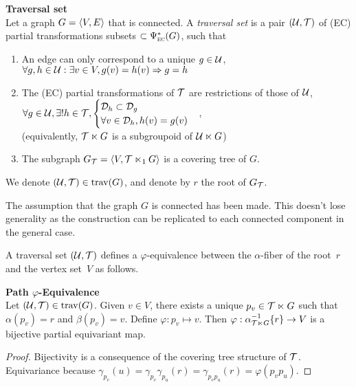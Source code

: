 \begin{definition}\textbf{Traversal set}\\
Let a graph $G = \langle V, E \rangle$ that is connected. A \emph{traversal set} is a pair $(\mathcal{U}, \mathcal{T})$ of (EC) partial transformations subsets $\subset \Psi_{\operatorname{\textsc{ec}}}^*(G)$, such that
\begin{enumerate}
  \item An edge can only correspond to a unique $g\in \mathcal{U}$,\\
    \ie $\forall g,h \in \mathcal{U} : \exists v \in V, g(v) = h(v) \Rightarrow g=h$
  \item The (EC) partial transformations of $\mathcal{T}$ are restrictions of those of $\mathcal{U}$,\\
    \ie $\forall g \in \mathcal{U}, \exists! h \in \mathcal{T}, \begin{cases}\mathcal{D}_h \subset \mathcal{D}_g\\ \forall v \in \mathcal{D}_h, h(v) = g(v)\end{cases}$, \\
    (equivalently, $\mathcal{T} \ltimes G$ is a subgroupoid of $\mathcal{U} \ltimes G$)
  \item The subgraph $G_{\mathcal{T}} = \langle V, \mathcal{T} \ltimes_1 G \rangle$ is a covering tree of $G$.
\end{enumerate}
We denote $(\mathcal{U}, \mathcal{T}) \in \operatorname{trav}(G)$, and denote by $r$ the root of $G_{\mathcal{T}}$.
\end{definition}

\begin{remark}The assumption that the graph $G$ is connected has been made. This doesn't lose generality as the construction can be replicated to each connected component in the general case.
\end{remark}

A traversal set $(\mathcal{U}, \mathcal{T})$ defines a $\varphi$-equivalence between the $\alpha$-fiber of the root~$r$ and the vertex set~$V$ as follows.

\begin{lemma}\textbf{Path $\varphi$-Equivalence}\\
Let $(\mathcal{U}, \mathcal{T}) \in \operatorname{trav}(G)$. Given $v \in V$, there exists a unique $p_v \in \mathcal{T} \ltimes G$ such that $\alpha(p_v) = r$ and $\beta(p_v) = v$. Define $\varphi: p_v \mapsto v$. Then $\varphi: \alpha^{-1}_{\mathcal{T} \ltimes G}\{r\} \rightarrow V$ is a bijective partial equivariant map.
\end{lemma}
\begin{proof}
Bijectivity is a consequence of the covering tree structure of $\mathcal{T}$.
Equivariance because $\gamma_{p_v}(u) = \gamma_{p_v}\gamma_{p_u}(r) = \gamma_{p_vp_u}(r) = \varphi(p_vp_u)$.
\end{proof}

